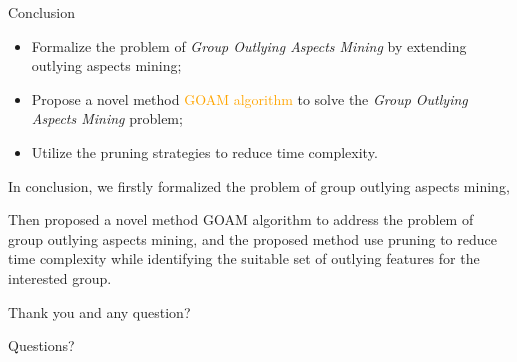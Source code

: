 \documentclass[
 size=14pt,
 paper=smartboard,  %
 mode=present, 		%
 display=slides, 	%
 style=tuliplab,  	%
 pauseslide,
 fleqn,leqno]{powerdot}
\begin{document}
\begin{slide}[toc=,bm=]{Conclusion}
\begin{itemize}
\item
\smallskip
Formalize the problem of \emph{Group Outlying Aspects Mining} by
extending outlying aspects mining;

\item
\smallskip
Propose a novel method \textcolor{orange}{GOAM algorithm} to solve the
\emph{Group Outlying Aspects Mining} problem;

\item
\smallskip
Utilize the pruning strategies to reduce time complexity.

\end{itemize}

\begin{note}
In conclusion,
we firstly formalized the problem of
group outlying aspects mining,

Then proposed a novel method GOAM algorithm to address the problem of
group outlying aspects mining,
and the proposed method use pruning to reduce time complexity
while identifying the suitable set of outlying features for the interested group.

Thank you and any question?
\end{note}

\end{slide}


%
\begin{slide}[toc=,bm=]{Questions?}
\begin{center}
\begin{figure}
\end{figure}
\end{center}
\end{slide}
\end{document}
